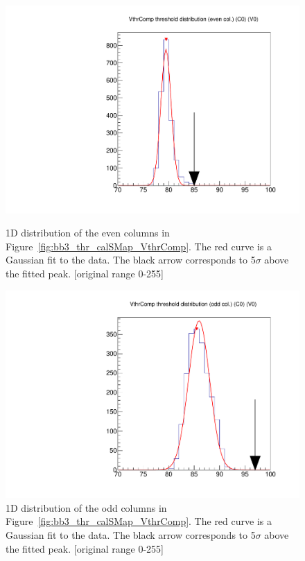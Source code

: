 \begin{figure}[!htp]
\centering
\begin{minipage}{0.45\textwidth}
  \includegraphics[width=1.0\textwidth]{figures/bb3_dist_thr_calSMap_VthrComp_EvenCol.pdf}
  \caption{1D distribution of the even columns in Figure~\ref{fig:bb3_thr_calSMap_VthrComp}.
  The red curve is a Gaussian fit to the data.
  The black arrow corresponds to 5$\sigma$ above the fitted peak.
  [original range 0-255]}
  \label{fig:bb3_dist_thr_calSMap_VthrComp_EvenCol}
\end{minipage}
\hspace{0.3cm}
\begin{minipage}{0.45\textwidth}
  \includegraphics[width=1.0\textwidth]{figures/bb3_dist_thr_calSMap_VthrComp_OddCol.pdf}
  \caption{1D distribution of the odd columns in Figure~\ref{fig:bb3_thr_calSMap_VthrComp}.
  The red curve is a Gaussian fit to the data.
  The black arrow corresponds to 5$\sigma$ above the fitted peak.
  [original range 0-255]}
  \label{fig:bb3_dist_thr_calSMap_VthrComp_OddCol}
\end{minipage}
\end{figure}

